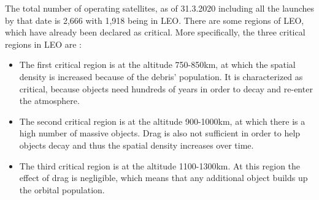 The total number of operating satellites, as of 31.3.2020 including all the launches by that date is 2,666 with 1,918 being in LEO. \cite{UCS} There are some regions of LEO, which have already been declared as critical. More specifically, the three critical regions in LEO are \cite{Kramer 2002}:
\begin{itemize}
\item The first critical region is at the altitude 750-850km, at which the spatial density is increased because of the debris' population. It is characterized as critical, because objects need hundreds of years in order to decay and re-enter the atmosphere.
\item The second critical region is at the altitude 900-1000km, at which there is a high number of massive objects. Drag is also not sufficient in order to help objects decay and thus the spatial density increases over time.
\item The third critical region is at the altitude 1100-1300km. At this region the effect of drag is negligible, which means that any additional object builds up the orbital population.
\end{itemize}


